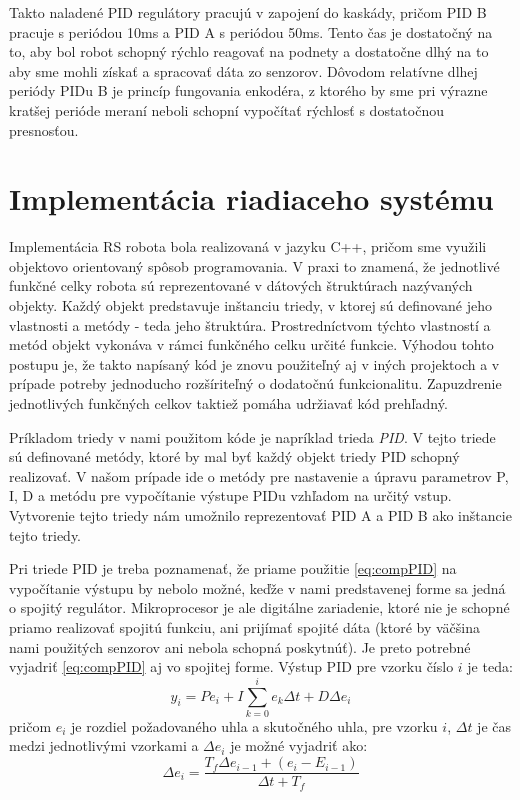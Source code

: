 Takto naladené PID regulátory pracujú v zapojení do kaskády, pričom PID B pracuje s periódou 10ms a PID A s periódou 50ms. Tento čas je dostatočný na to, aby bol robot schopný rýchlo reagovať na podnety a dostatočne dlhý na to aby sme mohli získať a spracovať dáta zo senzorov. Dôvodom relatívne dlhej periódy PIDu B je princíp fungovania enkodéra, z ktorého by sme pri výrazne kratšej perióde meraní neboli schopní vypočítať rýchlosť s dostatočnou presnosťou.   

\section{Implementácia riadiaceho systému}
Implementácia \ac{RS} robota bola realizovaná v jazyku C++, pričom sme využili objektovo orientovaný spôsob programovania. V praxi to znamená, že jednotlivé funkčné celky robota sú reprezentované v dátových štruktúrach nazývaných objekty. Každý objekt predstavuje inštanciu triedy, v ktorej sú definované jeho vlastnosti a metódy - teda jeho štruktúra. Prostredníctvom týchto vlastností a metód objekt vykonáva v rámci funkčného celku určité funkcie. Výhodou tohto postupu je, že takto napísaný kód je znovu použiteľný aj v iných projektoch a v prípade potreby jednoducho rozšíriteľný o dodatočnú funkcionalitu. Zapuzdrenie jednotlivých funkčných celkov taktiež pomáha udržiavať kód prehľadný.

Príkladom triedy v nami použitom kóde je napríklad trieda \textit{PID}. V tejto triede sú definované metódy, ktoré by mal byť každý objekt triedy PID schopný realizovať. V našom prípade ide o metódy pre nastavenie a úpravu parametrov P, I, D a metódu pre vypočítanie výstupe PIDu vzhľadom na určitý vstup. Vytvorenie tejto triedy nám umožnilo reprezentovať PID A a PID B ako inštancie tejto triedy. 

Pri triede PID je treba poznamenať, že priame použitie \ref{eq:compPID} na vypočítanie výstupu by nebolo možné, keďže v nami predstavenej forme sa jedná o spojitý regulátor. Mikroprocesor je ale digitálne zariadenie, ktoré nie je schopné priamo realizovať spojitú funkciu, ani prijímať spojité dáta (ktoré by väčšina nami použitých senzorov ani nebola schopná poskytnúť). Je preto potrebné vyjadriť \ref{eq:compPID} aj vo spojitej forme. Výstup PID pre vzorku číslo $i$ je teda:
\begin{equation}
y_i = Pe_i + I\sum_{k=0}^{i}{e_k}\Delta t + D\Delta e_i 
\end{equation}
pričom $e_i$ je rozdiel požadovaného uhla a skutočného uhla, pre vzorku $i$, $\Delta t$ je čas medzi jednotlivými vzorkami a $\Delta e_i$ je možné vyjadriť ako:
\begin{equation}
\Delta e_i = \dfrac{T_f\Delta e_{i-1} + (e_i - E_{i-1})}{\Delta t + T_f}
\end{equation}


